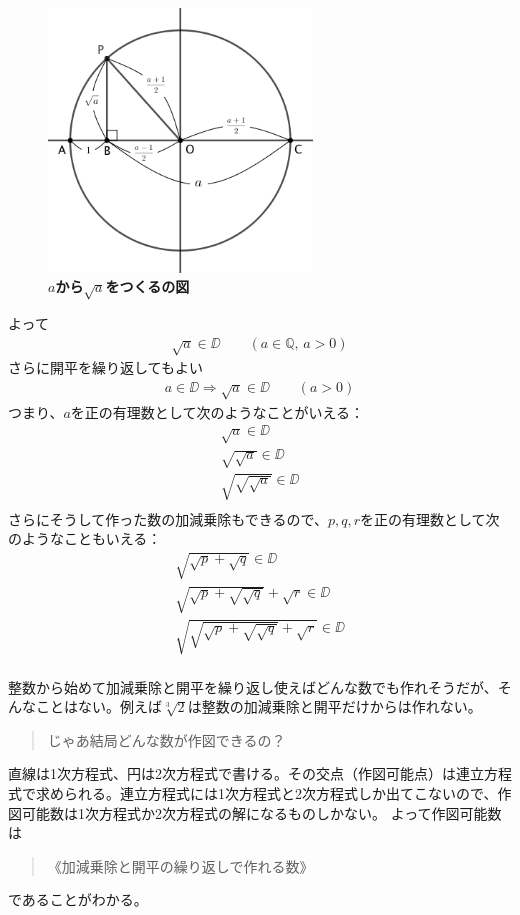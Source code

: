 \begin{figure}[H]
  \centering
  \includegraphics[clip, width=7cm]{nakayama2/image/root.png}\\
  \bf $a$から$\sqrt{a}$をつくるの図
\end{figure}

よって
\begin{align*}
  \sqrt{a} \in \DD \qquad (a \in \mathbb{Q},\, a > 0)
\end{align*}
さらに開平を繰り返してもよい
\begin{align*}
  a \in \DD \Rightarrow \sqrt{a} \in \DD \qquad (a > 0)
\end{align*}
つまり、$a$を正の有理数として次のようなことがいえる：
\begin{align*}
  \sqrt{a} \in \DD\\
  \sqrt{\sqrt{a}} \in \DD\\
  \sqrt{\sqrt{\sqrt{a}}} \in \DD\\
\end{align*}
さらにそうして作った数の加減乗除もできるので、$p,q,r$を正の有理数として次のようなこともいえる：
\begin{align*}
  \sqrt{\sqrt{p} + \sqrt{q}} \in \DD\\
  \sqrt{\sqrt{p} + \sqrt{\sqrt{q}}} + \sqrt{r} \in \DD\\
  \sqrt{\sqrt{\sqrt{p} + \sqrt{\sqrt{q}}} + \sqrt{r}} \in \DD\\
\end{align*}\par
整数から始めて加減乗除と開平を繰り返し使えばどんな数でも作れそうだが、そんなことはない。例えば$\sqrt[3]{2}$は整数の加減乗除と開平だけからは作れない。
\begin{quote}
  じゃあ結局どんな数が作図できるの？
\end{quote}
直線は1次方程式、円は2次方程式で書ける。その交点（作図可能点）は連立方程式で求められる。連立方程式には1次方程式と2次方程式しか出てこないので、作図可能数は1次方程式か2次方程式の解になるものしかない。
よって作図可能数は
\begin{quote}
  《加減乗除と開平の繰り返しで作れる数》
\end{quote}
であることがわかる。

